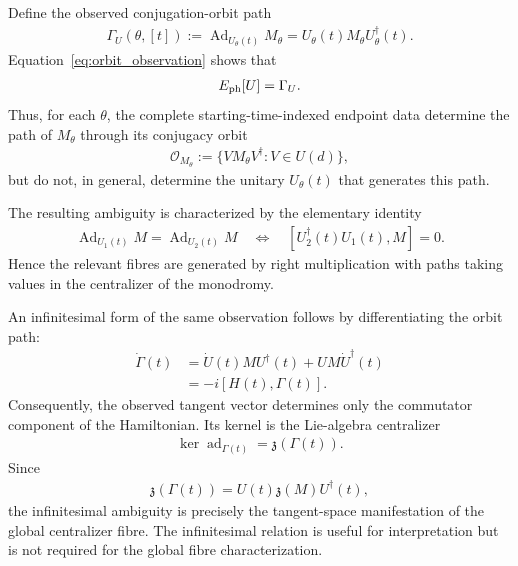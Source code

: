 \documentclass[twocolumn,prl,aps,floatfix]{revtex4-2}
\begin{document}
Define the observed conjugation-orbit path
\begin{align}
\Gamma_U(\theta,[t])
:=
\operatorname{Ad}_{U_\theta(t)}M_\theta
=
U_\theta(t)M_\theta U_\theta^\dagger(t).
\end{align}
Equation~\eqref{eq:orbit_observation} shows that
\begin{align}
E_{\rm ph}[U]=\Gamma_U.
\end{align}
Thus, for each $\theta$, the complete starting-time-indexed endpoint data determine the path of $M_\theta$ through its conjugacy orbit
\begin{align}
\mathcal O_{M_\theta}
:=
\{VM_\theta V^\dagger:V\in U(d)\},
\end{align}
but do not, in general, determine the unitary $U_\theta(t)$ that generates this path.

The resulting ambiguity is characterized by the elementary identity
\begin{align}
\operatorname{Ad}_{U_1(t)}M
=
\operatorname{Ad}_{U_2(t)}M
\quad\Longleftrightarrow\quad
[U_2^\dagger(t)U_1(t),M]=0.
\label{eq:orbit_fibre_identity}
\end{align}
Hence the relevant fibres are generated by right multiplication with paths taking values in the centralizer of the monodromy.

An infinitesimal form of the same observation follows by differentiating the orbit path:
\begin{align}
\dot\Gamma(t)
&=
\dot U(t)MU^\dagger(t)
+
UM\dot U^\dagger(t)
\nonumber\\
&=
-i[H(t),\Gamma(t)].
\label{eq:Gamma_dot}
\end{align}
Consequently, the observed tangent vector determines only the commutator component of the Hamiltonian. Its kernel is the Lie-algebra centralizer
\begin{align}
\ker\operatorname{ad}_{\Gamma(t)}
=
\mathfrak z(\Gamma(t)).
\end{align}
Since
\begin{align}
\mathfrak z(\Gamma(t))
=
U(t)\mathfrak z(M)U^\dagger(t),
\end{align}
the infinitesimal ambiguity is precisely the tangent-space manifestation of the global centralizer fibre. The infinitesimal relation is useful for interpretation but is not required for the global fibre characterization.
\end{document}
